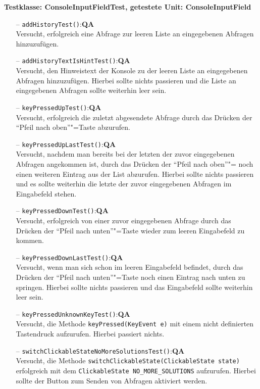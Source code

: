 \documentclass[parskip=full,11pt,twoside]{scrartcl}
\def\qa{\hfill\textbf{QA}}
\begin{document}
\textbf{Testklasse: ConsoleInputFieldTest, getestete Unit: ConsoleInputField}
\begin{itemize}
	\item[--] \texttt{addHistoryTest()}:\qa\\
	Versucht, erfolgreich eine Abfrage zur leeren Liste an eingegebenen Abfragen hinzuzufügen.
	\item[--] \texttt{addHistoryTextIsHintTest()}:\qa\\
	Versucht, den Hinweistext der Konsole zu der leeren Liste an eingegebenen Abfragen hinzuzufügen. Hierbei sollte nichts passieren und die Liste an eingegebenen Abfragen sollte weiterhin leer sein.
	\item[--] \texttt{keyPressedUpTest()}:\qa\\
	Versucht, erfolgreich die zuletzt abgesendete Abfrage durch das Drücken der \enquote{Pfeil nach oben}"=Taste abzurufen.
	\item[--] \texttt{keyPressedUpLastTest()}:\qa\\
	Versucht, nachdem man bereits bei der letzten der zuvor eingegebenen Abfragen angekommen ist, durch das Drücken der \enquote{Pfeil nach oben}"= noch einen weiteren Eintrag aus der List abzurufen. Hierbei sollte nichts passieren und es sollte weiterhin die letzte der zuvor eingegebenen Abfragen im Eingabefeld stehen.
	\item[--] \texttt{keyPressedDownTest()}:\qa\\
	Versucht, erfolgreich von einer zuvor eingegebenen Abfrage durch das Drücken der \enquote{Pfeil nach unten}"=Taste wieder zum leeren Eingabefeld zu kommen.
	\item[--] \texttt{keyPressedDownLastTest()}:\qa\\
	Versucht, wenn man sich schon im leeren Eingabefeld befindet, durch das Drücken der \enquote{Pfeil nach unten}"=Taste noch einen Eintrag nach unten zu springen. Hierbei sollte nichts passieren und das Eingabefeld sollte weiterhin leer sein.
	\item[--] \texttt{keyPressedUnknownKeyTest()}:\qa\\
	Versucht, die Methode \texttt{keyPressed(KeyEvent e)} mit einem nicht definierten Tastendruck aufzurufen. Hierbei passiert nichts.
	\item[--] \texttt{switchClickableStateNoMoreSolutionsTest()}:\qa\\
	Versucht, die Methode \texttt{switchClickableState(ClickableState state)}\\erfolgreich mit dem \texttt{ClickableState NO\_MORE\_SOLUTIONS} aufzurufen. Hierbei sollte der Button zum Senden von Abfragen aktiviert werden.

\end{itemize}
\end{document}

